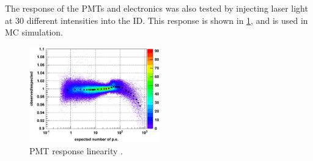 The response of the PMTs and electronics was also tested by injecting laser light at 30 different intensities into the ID.  This response is shown in \cref{fig:pmt_linearity}, and is used in MC simulation.  \par 
\begin{figure}
\centering
\includegraphics[width=0.5\textwidth,keepaspectratio]{figures/PMT_linearity.png}
\caption{PMT response linearity \cite{Abe:2013gga}.}
\label{fig:pmt_linearity}	
\end{figure} 
